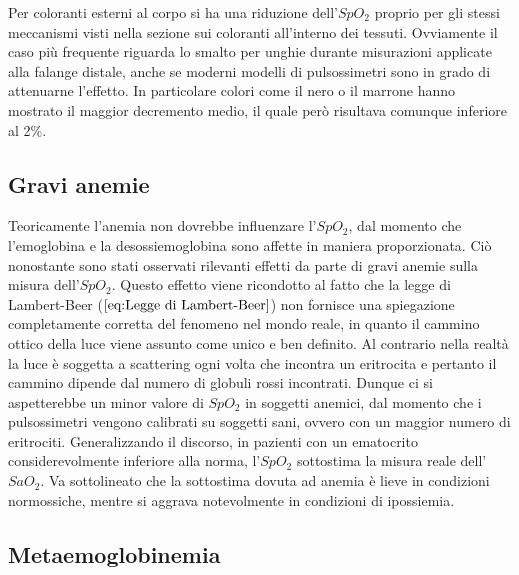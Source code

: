 \documentclass[a4paper, 12pt]{book}
\begin{document}
Per coloranti esterni al corpo si ha una riduzione dell'$SpO_2$ proprio per gli stessi meccanismi visti nella sezione sui coloranti all'interno dei tessuti.
Ovviamente il caso più frequente riguarda lo smalto per unghie durante misurazioni applicate alla falange distale, anche se moderni modelli di pulsossimetri sono in grado di attenuarne l'effetto.
In particolare colori come il nero o il marrone hanno mostrato il maggior decremento medio, il quale però risultava comunque inferiore al 2\%.%


\subsection{Gravi anemie}

Teoricamente l'anemia non dovrebbe influenzare l'$SpO_2$, dal momento che l'emoglobina e la desossiemoglobina sono affette in maniera proporzionata.
Ciò nonostante sono stati osservati rilevanti effetti da parte di gravi anemie sulla misura dell'$SpO_2$.
Questo effetto viene ricondotto al fatto che la legge di Lambert-Beer ($\ref{eq:Legge di Lambert-Beer}$) non fornisce una spiegazione completamente corretta del fenomeno nel mondo reale, in quanto il cammino ottico della luce viene assunto come unico e ben definito.
Al contrario nella realtà la luce è soggetta a scattering ogni volta che incontra un eritrocita e pertanto il cammino dipende dal numero di globuli rossi incontrati.
Dunque ci si aspetterebbe un minor valore di $SpO_2$ in soggetti anemici, dal momento che i pulsossimetri vengono calibrati su soggetti sani, ovvero con un maggior numero di eritrociti.
Generalizzando il discorso, in pazienti con un ematocrito considerevolmente inferiore alla norma, l'$SpO_2$ sottostima la misura reale dell'$SaO_2$.
Va sottolineato che la sottostima dovuta ad anemia è lieve in condizioni normossiche, mentre si aggrava notevolmente in condizioni di ipossiemia.


\subsection{Metaemoglobinemia}
\end{document}
